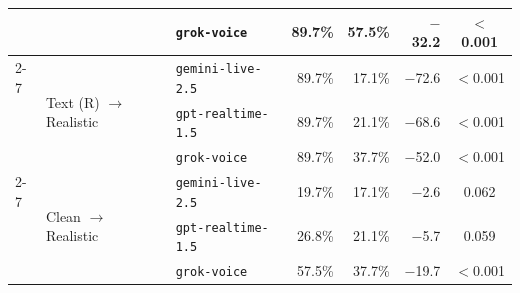 \begin{tabular}{lllrrrc}
 &  & {\texttt{grok-voice}} & 89.7\% & 57.5\% & $-$32.2 & $<$0.001 \\
\cmidrule(l){2-7}
 & \multirow{3}{*}{Text (R) $\to$ Realistic} & {\texttt{gemini-live-2.5}} & 89.7\% & 17.1\% & $-$72.6 & $<$0.001 \\
 &  & {\texttt{gpt-realtime-1.5}} & 89.7\% & 21.1\% & $-$68.6 & $<$0.001 \\
 &  & {\texttt{grok-voice}} & 89.7\% & 37.7\% & $-$52.0 & $<$0.001 \\
\cmidrule(l){2-7}
 & \multirow{3}{*}{Clean $\to$ Realistic} & {\texttt{gemini-live-2.5}} & 19.7\% & 17.1\% & $-$2.6 & 0.062 \\
 &  & {\texttt{gpt-realtime-1.5}} & 26.8\% & 21.1\% & $-$5.7 & 0.059 \\
 &  & {\texttt{grok-voice}} & 57.5\% & 37.7\% & $-$19.7 & $<$0.001 \\
\bottomrule
\end{tabular}
